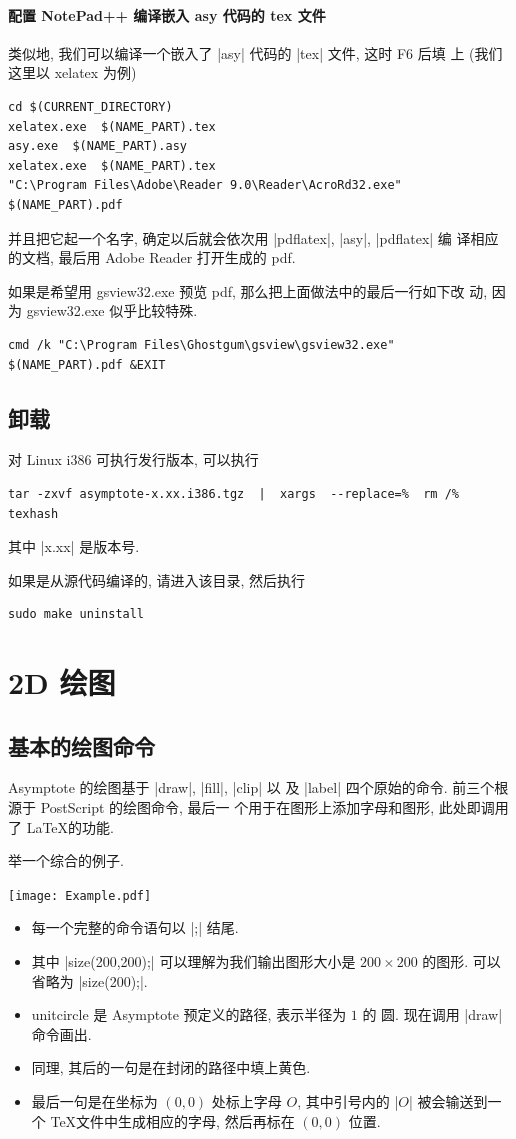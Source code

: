 \documentclass{ctexbook}
\begin{document}
\subsubsection{配置 NotePad++ 编译嵌入 asy 代码的 tex 文件}
类似地, 我们可以编译一个嵌入了 |asy| 代码的 |tex| 文件, 这时 F6 后填
上 (我们这里以 xelatex 为例)
\begin{verbatim}
cd $(CURRENT_DIRECTORY)
xelatex.exe  $(NAME_PART).tex
asy.exe  $(NAME_PART).asy
xelatex.exe  $(NAME_PART).tex
"C:\Program Files\Adobe\Reader 9.0\Reader\AcroRd32.exe" $(NAME_PART).pdf
\end{verbatim}
并且把它起一个名字, 确定以后就会依次用 |pdflatex|, |asy|, |pdflatex| 编
译相应的文档, 最后用 Adobe Reader 打开生成的 pdf.

如果是希望用 gsview32.exe 预览 pdf, 那么把上面做法中的最后一行如下改
动, 因为 gsview32.exe 似乎比较特殊.
\begin{verbatim}
cmd /k "C:\Program Files\Ghostgum\gsview\gsview32.exe" $(NAME_PART).pdf &EXIT
\end{verbatim}

\section{卸载}
对 Linux i386 可执行发行版本, 可以执行
\begin{verbatim}
tar -zxvf asymptote-x.xx.i386.tgz  |  xargs  --replace=%  rm /%
texhash
\end{verbatim}
其中 |x.xx| 是版本号.

如果是从源代码编译的, 请进入该目录, 然后执行
\begin{verbatim}
sudo make uninstall
\end{verbatim}


\chapter{2D 绘图}

\section{基本的绘图命令}
Asymptote 的绘图基于 |draw|, |fill|, |clip| 以
及 |label| 四个原始的命令. 前三个根源于 PostScript 的绘图命令, 最后一
个用于在图形上添加字母和图形, 此处即调用了 \LaTeX 的功能.

举一个综合的例子.
\begin{center}\texttt{[image: Example.pdf]}\end{center}%

\begin{itemize}
\item 每一个完整的命令语句以 |;| 结尾.
\item 其中 |size(200,200);| 可以理解为我们输出图形大小是 $200\times 200$
  的图形. 可以省略为 |size(200);|.
\item {unitcircle} 是 Asymptote 预定义的路径, 表示半径为 $1$ 的
  圆. 现在调用 |draw| 命令画出.
\item 同理, 其后的一句是在封闭的路径中填上黄色.
\item 最后一句是在坐标为 $(0,0)$ 处标上字母 $O$, 其中引号内的 |$O$|
  被会输送到一个 \TeX 文件中生成相应的字母, 然后再标在 $(0,0)$ 位置.
\end{itemize}
\end{document}
